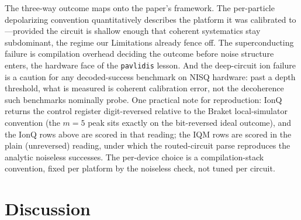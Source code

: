 \documentclass[aps,pra,reprint,superscriptaddress,nofootinbib,floatfix]{revtex4-2}
\begin{document}
The three-way outcome maps onto the paper's framework. The
per-particle depolarizing convention quantitatively describes the
platform it was calibrated to---provided the circuit is shallow enough
that coherent systematics stay subdominant, the regime our Limitations
already fence off. The superconducting failure is compilation
overhead deciding the outcome before noise structure enters, the
hardware face of the \texttt{pavlidis} lesson. And the deep-circuit
ion failure is a caution for any decoded-success benchmark on NISQ
hardware: past a depth threshold, what is measured is coherent
calibration error, not the decoherence such benchmarks nominally
probe. One practical note for reproduction: IonQ returns the control
register digit-reversed relative to the Braket local-simulator
convention (the $m=5$ peak sits exactly on the bit-reversed ideal
outcome), and the IonQ rows above are scored in that reading; the IQM
rows are scored in the plain (unreversed) reading, under which the
routed-circuit parse reproduces the analytic noiseless successes. The
per-device choice is a compilation-stack convention, fixed per
platform by the noiseless check, not tuned per circuit.

\section{Discussion}
\label{sec:discussion}
\end{document}
